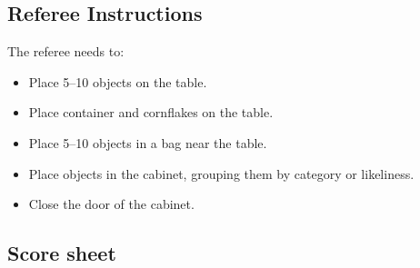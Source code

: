\subsection*{Referee Instructions}

The referee needs to:
\begin{itemize}
	\item Place 5--10 objects on the table.
	\item Place container and cornflakes on the table.
	\item Place 5--10 objects in a bag near the table.
	\item Place objects in the cabinet, grouping them by category or likeliness.
	\item Close the door of the cabinet.
\end{itemize}


\subsection*{Score sheet}


